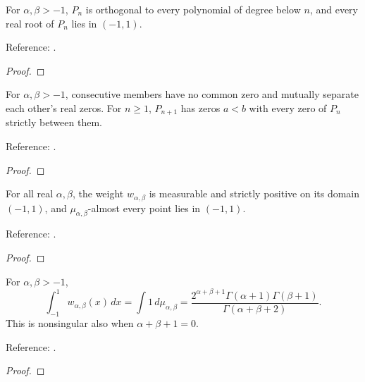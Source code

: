 \begin{theorem}
\label{thm:jacobi-root-location}
\leanok
For $\alpha,\beta>-1$, $P_n$ is orthogonal to every polynomial of degree below $n$, and every real root of $P_n$ lies in $(-1,1)$.

Reference: \cite[18.2(i), (vi)]{dlmf}.
\end{theorem}
\begin{proof}
\leanok
\end{proof}

\begin{theorem}
\label{thm:jacobi-interlacing}
\leanok
For $\alpha,\beta>-1$, consecutive members have no common zero and mutually separate each other's real zeros. For $n\ge1$, $P_{n+1}$ has zeros $a<b$ with every zero of $P_n$ strictly between them.

Reference: \cite[18.2(vi)]{dlmf}.
\end{theorem}
\begin{proof}
\leanok
\end{proof}

\begin{supporting}

\begin{theorem}
\label{thm:jacobi-weight-basic}
\leanok
For all real $\alpha,\beta$, the weight $w_{\alpha,\beta}$ is measurable
and strictly positive on its domain $(-1,1)$, and
$\mu_{\alpha,\beta}$-almost every point lies in $(-1,1)$.

Reference: \cite[Table 18.3.1]{dlmf}.
\end{theorem}
\begin{proof}
\leanok
\end{proof}

\begin{theorem}
\label{thm:jacobi-mass}
\leanok
For $\alpha,\beta>-1$,
\[\int_{-1}^1 w_{\alpha,\beta}(x)\,dx=\int1\,d\mu_{\alpha,\beta}
 =\frac{2^{\alpha+\beta+1}\Gamma(\alpha+1)\Gamma(\beta+1)}{\Gamma(\alpha+\beta+2)}.\]
This is nonsingular also when $\alpha+\beta+1=0$.

Reference: \cite[Table 18.3.1]{dlmf}.
\end{theorem}
\begin{proof}
\leanok
\end{proof}

\end{supporting}

